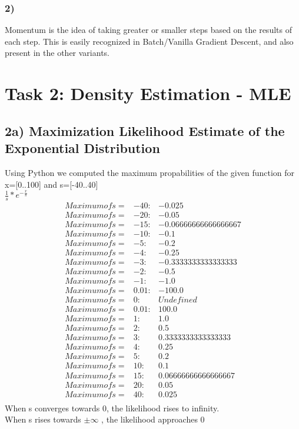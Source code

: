 \documentclass{article}
\begin{document}
\subsubsection{2)}
	Momentum is the idea of taking greater or smaller steps based on the results of each step. This is easily recognized in Batch/Vanilla Gradient Descent, and also present in the other variants.
	
\section{Task 2: Density Estimation - MLE}
\subsection{2a) Maximization Likelihood Estimate of the Exponential Distribution}
	Using Python we computed the maximum propabilities of the given function for x=[0..100] and s=[-40..40]\\
	$\frac{1}{s} * e^{-\frac{x}{s} }$		\\
	\begin{align*}
	Maximum of s= &-40 : & -0.025\\
	Maximum of s= &-20 : & -0.05\\
	Maximum of s= &-15 : & -0.06666666666666667\\
	Maximum of s= &-10 : & -0.1\\
	Maximum of s= &-5 :  &-0.2\\
	Maximum of s= &-4 :  &-0.25\\
	Maximum of s= &-3 :  &-0.3333333333333333\\
	Maximum of s= &-2 :  &-0.5\\
	Maximum of s= &-1 :  &-1.0\\
	Maximum of s= &0.01 : & -100.0\\
	Maximum of s= &0 :  &Undefined\\
	Maximum of s= &0.01 :&  100.0\\
	Maximum of s= &1 :  &1.0\\
	Maximum of s= &2 :  &0.5\\
	Maximum of s= &3 :  &0.3333333333333333\\
	Maximum of s= &4 :  &0.25\\
	Maximum of s= &5 :  &0.2\\
	Maximum of s= &10 :  &0.1\\
	Maximum of s= &15 :  &0.06666666666666667\\
	Maximum of s= &20 :  &0.05\\
	Maximum of s= &40 :  &0.025\\
	\end{align*}
	When s converges towards 0, the likelihood rises to infinity.\\
	When s rises towards $\pm\infty$ , the likelihood approaches 0
	
\end{document}
